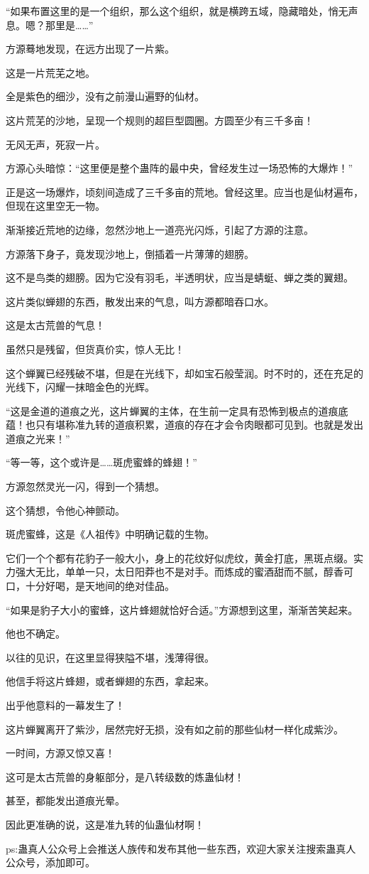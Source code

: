 \begin{this_body}
“如果布置这里的是一个组织，那么这个组织，就是横跨五域，隐藏暗处，悄无声息。嗯？那里是……”

方源蓦地发现，在远方出现了一片紫。

这是一片荒芜之地。

全是紫色的细沙，没有之前漫山遍野的仙材。

这片荒芜的沙地，呈现一个规则的超巨型圆圈。方圆至少有三千多亩！

无风无声，死寂一片。

方源心头暗惊：“这里便是整个蛊阵的最中央，曾经发生过一场恐怖的大爆炸！”

正是这一场爆炸，顷刻间造成了三千多亩的荒地。曾经这里。应当也是仙材遍布，但现在这里空无一物。

渐渐接近荒地的边缘，忽然沙地上一道亮光闪烁，引起了方源的注意。

方源落下身子，竟发现沙地上，倒插着一片薄薄的翅膀。

这不是鸟类的翅膀。因为它没有羽毛，半透明状，应当是蜻蜓、蝉之类的翼翅。

这片类似蝉翅的东西，散发出来的气息，叫方源都暗吞口水。

这是太古荒兽的气息！

虽然只是残留，但货真价实，惊人无比！

这个蝉翼已经残破不堪，但是在光线下，却如宝石般莹润。时不时的，还在充足的光线下，闪耀一抹暗金色的光辉。

“这是金道的道痕之光，这片蝉翼的主体，在生前一定具有恐怖到极点的道痕底蕴！也只有堪称准九转的道痕积累，道痕的存在才会令肉眼都可见到。也就是发出道痕之光来！”

“等一等，这个或许是……斑虎蜜蜂的蜂翅！”

方源忽然灵光一闪，得到一个猜想。

这个猜想，令他心神颤动。

斑虎蜜蜂，这是《人祖传》中明确记载的生物。

它们一个个都有花豹子一般大小，身上的花纹好似虎纹，黄金打底，黑斑点缀。实力强大无比，单单一只，太日阳莽也不是对手。而炼成的蜜酒甜而不腻，醇香可口，十分好喝，是天地间的绝对佳品。

“如果是豹子大小的蜜蜂，这片蜂翅就恰好合适。”方源想到这里，渐渐苦笑起来。

他也不确定。

以往的见识，在这里显得狭隘不堪，浅薄得很。

他信手将这片蜂翅，或者蝉翅的东西，拿起来。

出乎他意料的一幕发生了！

这片蝉翼离开了紫沙，居然完好无损，没有如之前的那些仙材一样化成紫沙。

一时间，方源又惊又喜！

这可是太古荒兽的身躯部分，是八转级数的炼蛊仙材！

甚至，都能发出道痕光晕。

因此更准确的说，这是准九转的仙蛊仙材啊！

ps:蛊真人公众号上会推送人族传和发布其他一些东西，欢迎大家关注搜索蛊真人公众号，添加即可。

\end{this_body}

